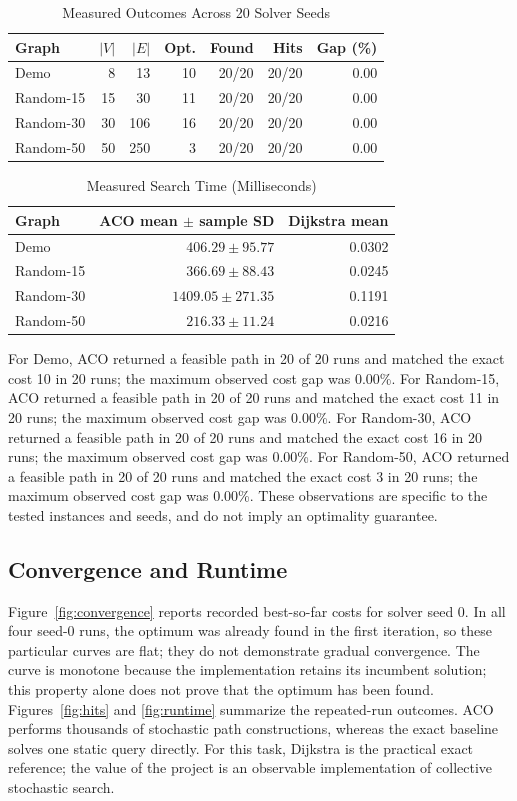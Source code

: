 \documentclass[conference]{IEEEtran}
\begin{document}
\begin{table}[tb]
\caption{Measured Outcomes Across 20 Solver Seeds}
\label{tab:results}
\centering\scriptsize
\begin{tabular}{lrrrrrr}\hline
Graph & $|V|$ & $|E|$ & Opt. & Found & Hits & Gap (\%)\\\hline
Demo & 8 & 13 & 10 & 20/20 & 20/20 & 0.00 \\
Random-15 & 15 & 30 & 11 & 20/20 & 20/20 & 0.00 \\
Random-30 & 30 & 106 & 16 & 20/20 & 20/20 & 0.00 \\
Random-50 & 50 & 250 & 3 & 20/20 & 20/20 & 0.00 \\
\hline\end{tabular}
\end{table}
\begin{table}[tb]
\caption{Measured Search Time (Milliseconds)}
\centering\small
\begin{tabular}{lrr}\hline
Graph & ACO mean $\pm$ sample SD & Dijkstra mean\\\hline
Demo & $406.29 \pm 95.77$ & 0.0302 \\
Random-15 & $366.69 \pm 88.43$ & 0.0245 \\
Random-30 & $1409.05 \pm 271.35$ & 0.1191 \\
Random-50 & $216.33 \pm 11.24$ & 0.0216 \\
\hline\end{tabular}\end{table}

For Demo, ACO returned a feasible path in 20 of 20 runs and matched the exact cost 10 in 20 runs; the maximum observed cost gap was 0.00\%. For Random-15, ACO returned a feasible path in 20 of 20 runs and matched the exact cost 11 in 20 runs; the maximum observed cost gap was 0.00\%. For Random-30, ACO returned a feasible path in 20 of 20 runs and matched the exact cost 16 in 20 runs; the maximum observed cost gap was 0.00\%. For Random-50, ACO returned a feasible path in 20 of 20 runs and matched the exact cost 3 in 20 runs; the maximum observed cost gap was 0.00\%. These observations are specific to the tested instances and seeds, and do not imply an optimality guarantee.

\subsection{Convergence and Runtime}
Figure~\ref{fig:convergence} reports recorded best-so-far costs for solver seed 0. In all four seed-0 runs, the optimum was already found in the first iteration, so these particular curves are flat; they do not demonstrate gradual convergence. The curve is monotone because the implementation retains its incumbent solution; this property alone does not prove that the optimum has been found. Figures~\ref{fig:hits} and \ref{fig:runtime} summarize the repeated-run outcomes. ACO performs thousands of stochastic path constructions, whereas the exact baseline solves one static query directly. For this task, Dijkstra is the practical exact reference; the value of the project is an observable implementation of collective stochastic search.
\end{document}
